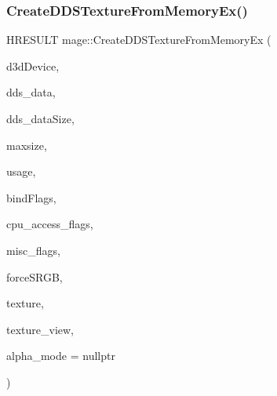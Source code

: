 \hypertarget{namespacemage_acb0dc8616d42bd8c67d22d6274580cb7}{}\label{namespacemage_acb0dc8616d42bd8c67d22d6274580cb7} 
\subsubsection{\texorpdfstring{Create\+D\+D\+S\+Texture\+From\+Memory\+Ex()}{CreateDDSTextureFromMemoryEx()}\hspace{0.1cm}{\footnotesize\ttfamily [1/4]}}
{\footnotesize\ttfamily H\+R\+E\+S\+U\+LT mage\+::\+Create\+D\+D\+S\+Texture\+From\+Memory\+Ex (\begin{DoxyParamCaption}\item[{\+\_\+\+In\+\_\+ I\+D3\+D11\+Device $\ast$}]{d3d\+Device,  }\item[{\+\_\+\+In\+\_\+reads\+\_\+bytes\+\_\+(dds\+\_\+data\+Size) const uint8\+\_\+t $\ast$}]{dds\+\_\+data,  }\item[{\+\_\+\+In\+\_\+ size\+\_\+t}]{dds\+\_\+data\+Size,  }\item[{\+\_\+\+In\+\_\+ size\+\_\+t}]{maxsize,  }\item[{\+\_\+\+In\+\_\+ D3\+D11\+\_\+\+U\+S\+A\+GE}]{usage,  }\item[{\+\_\+\+In\+\_\+ uint32\+\_\+t}]{bind\+Flags,  }\item[{\+\_\+\+In\+\_\+ uint32\+\_\+t}]{cpu\+\_\+access\+\_\+flags,  }\item[{\+\_\+\+In\+\_\+ uint32\+\_\+t}]{misc\+\_\+flags,  }\item[{\+\_\+\+In\+\_\+ bool}]{force\+S\+R\+GB,  }\item[{\+\_\+\+Outptr\+\_\+opt\+\_\+ I\+D3\+D11\+Resource $\ast$$\ast$}]{texture,  }\item[{\+\_\+\+Outptr\+\_\+opt\+\_\+ I\+D3\+D11\+Shader\+Resource\+View $\ast$$\ast$}]{texture\+\_\+view,  }\item[{\+\_\+\+Out\+\_\+opt\+\_\+ \hyperlink{namespacemage_a0c586a2bad862f4858900ca121ca80c2}{D\+D\+S\+\_\+\+A\+L\+P\+H\+A\+\_\+\+M\+O\+DE} $\ast$}]{alpha\+\_\+mode = {\ttfamily nullptr} }\end{DoxyParamCaption})}

\hypertarget{namespacemage_a55e3dfd62e363db1e284246ab1be5f48}{}\label{namespacemage_a55e3dfd62e363db1e284246ab1be5f48} 
